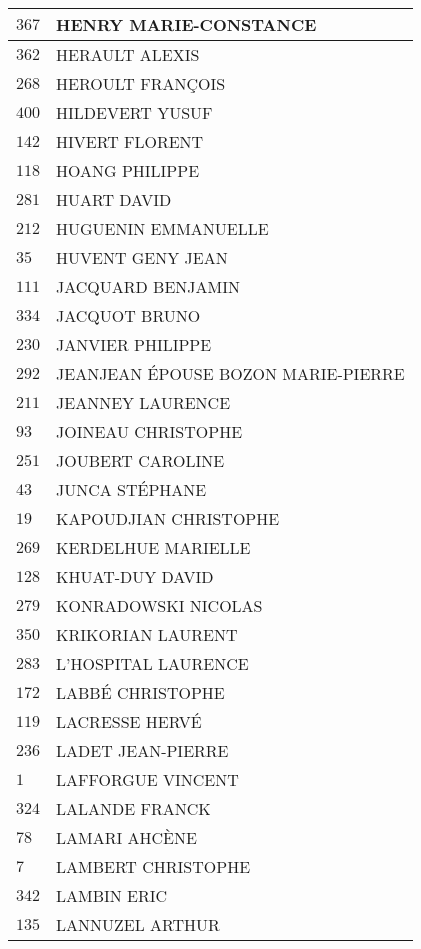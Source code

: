 \begin{xltabular}{\linewidth}{|l|X|}
    \hline
    $367$ & HENRY MARIE-CONSTANCE \\
    \hline
    $362$ & HERAULT ALEXIS \\
    \hline
    $268$ & HEROULT FRANÇOIS \\
    \hline
    $400$ & HILDEVERT YUSUF \\
    \hline
    $142$ & HIVERT FLORENT \\
    \hline
    $118$ & HOANG PHILIPPE \\
    \hline
    $281$ & HUART DAVID \\
    \hline
    $212$ & HUGUENIN EMMANUELLE \\
    \hline
    $35$ & HUVENT GENY JEAN \\
    \hline
    $111$ & JACQUARD BENJAMIN \\
    \hline
    $334$ & JACQUOT BRUNO \\
    \hline
    $230$ & JANVIER PHILIPPE \\
    \hline
    $292$ & JEANJEAN ÉPOUSE BOZON MARIE-PIERRE \\
    \hline
    $211$ & JEANNEY LAURENCE \\
    \hline
    $93$ & JOINEAU CHRISTOPHE \\
    \hline
    $251$ & JOUBERT CAROLINE \\
    \hline
    $43$ & JUNCA STÉPHANE \\
    \hline
    $19$ & KAPOUDJIAN CHRISTOPHE \\
    \hline
    $269$ & KERDELHUE MARIELLE \\
    \hline
    $128$ & KHUAT-DUY DAVID \\
    \hline
    $279$ & KONRADOWSKI NICOLAS \\
    \hline
    $350$ & KRIKORIAN LAURENT \\
    \hline
    $283$ & L'HOSPITAL LAURENCE \\
    \hline
    $172$ & LABBÉ CHRISTOPHE \\
    \hline
    $119$ & LACRESSE HERVÉ \\
    \hline
    $236$ & LADET JEAN-PIERRE \\
    \hline
    $1$ & LAFFORGUE VINCENT \\
    \hline
    $324$ & LALANDE FRANCK \\
    \hline
    $78$ & LAMARI AHCÈNE \\
    \hline
    $7$ & LAMBERT CHRISTOPHE \\
    \hline
    $342$ & LAMBIN ERIC \\
    \hline
    $135$ & LANNUZEL ARTHUR \\

\end{xltabular}
